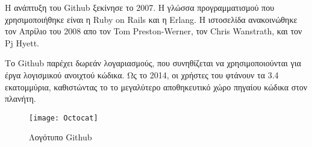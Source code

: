Η ανάπτυξη του Github ξεκίνησε το 2007. Η γλώσσα προγραμματισμού που χρησιμοποιήθηκε είναι η Ruby on Rails και η Erlang. Η ιστοσελίδα ανακοινώθηκε τον Απρίλιο του 2008 απο τον Tom Preston-Werner, τον Chris Wanstrath, και τον Pj Hyett.

Το Github παρέχει δωρεάν λογαριασμούς, που συνηθίζεται να χρησιμοποιούνται για έργα λογισμικού ανοιχτού κώδικα. Ως το 2014, οι χρήστες του φτάνουν τα 3.4 εκατομμύρια, καθιστώντας το το μεγαλύτερο αποθηκευτικό χώρο πηγαίου κώδικα στον πλανήτη.\\
\begin{figure}[h]
\centering
\texttt{[image: Octocat]}
\caption{Λογότυπο Github\cite{figure-23}}
\end{figure}
